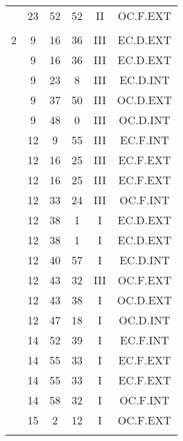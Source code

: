 \documentclass[12pt, a4paper]{article}
\begin{document}
\begin{multicols}{3}
{\begin{tabular}{c c c c c c}
	 	 	 	 & 23 & 52 & 52 & II & OC.F.EXT\\%
	 	 	 	 & & & & & \\%
	 	 	 	2 & 9 & 16 & 36 & III & EC.D.EXT\\%
	 	 	 	 & 9 & 16 & 36 & III & EC.D.EXT\\%
	 	 	 	 & 9 & 23 & 8 & III & EC.D.INT\\%
	 	 	 	 & 9 & 37 & 50 & III & OC.D.EXT\\%
	 	 	 	 & 9 & 48 & 0 & III & OC.D.INT\\%
	 	 	 	 & 12 & 9 & 55 & III & EC.F.INT\\%
	 	 	 	 & 12 & 16 & 25 & III & EC.F.EXT\\%
	 	 	 	 & 12 & 16 & 25 & III & EC.F.EXT\\%
	 	 	 	 & 12 & 33 & 24 & III & OC.F.INT\\%
	 	 	 	 & 12 & 38 & 1 & I & EC.D.EXT\\%
	 	 	 	 & 12 & 38 & 1 & I & EC.D.EXT\\%
	 	 	 	 & 12 & 40 & 57 & I & EC.D.INT\\%
	 	 	 	 & 12 & 43 & 32 & III & OC.F.EXT\\%
	 	 	 	 & 12 & 43 & 38 & I & OC.D.EXT\\%
	 	 	 	 & 12 & 47 & 18 & I & OC.D.INT\\%
	 	 	 	 & 14 & 52 & 39 & I & EC.F.INT\\%
	 	 	 	 & 14 & 55 & 33 & I & EC.F.EXT\\%
	 	 	 	 & 14 & 55 & 33 & I & EC.F.EXT\\%
	 	 	 	 & 14 & 58 & 32 & I & OC.F.INT\\%
	 	 	 	 & 15 & 2 & 12 & I & OC.F.EXT\\%
	 	 	 	 & & & & & \\%

\end{tabular}}
\end{multicols}
\end{document}
